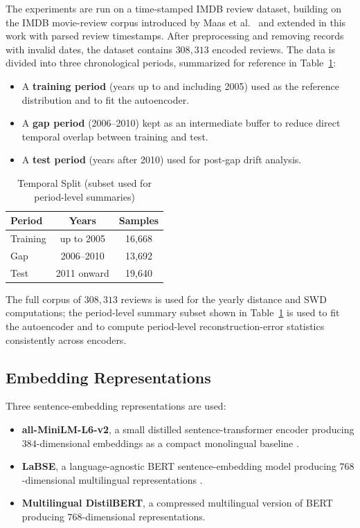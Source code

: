 \documentclass[conference]{IEEEtran}
\begin{document}
The experiments are run on a time-stamped IMDB review dataset, building on the IMDB movie-review corpus introduced by Maas et al.\ \cite{maas2011} and extended in this work with parsed review timestamps. After preprocessing and removing records with invalid dates, the dataset contains $308{,}313$ encoded reviews. The data is divided into three chronological periods, summarized for reference in Table~\ref{tab:periods}:

\begin{itemize}
    \item A \textbf{training period} (years up to and including 2005) used as the reference distribution and to fit the autoencoder.
    \item A \textbf{gap period} (2006--2010) kept as an intermediate buffer to reduce direct temporal overlap between training and test.
    \item A \textbf{test period} (years after 2010) used for post-gap drift analysis.
\end{itemize}

\begin{table}[htbp]
\caption{Temporal Split (subset used for period-level summaries)}
\label{tab:periods}
\begin{center}
\begin{tabular}{|l|c|c|}
\hline
\textbf{Period} & \textbf{Years} & \textbf{Samples} \\
\hline
Training & up to 2005 & 16{,}668 \\
Gap      & 2006--2010 & 13{,}692 \\
Test     & 2011 onward & 19{,}640 \\
\hline
\end{tabular}
\end{center}
\end{table}

The full corpus of $308{,}313$ reviews is used for the yearly distance and SWD computations; the period-level summary subset shown in Table~\ref{tab:periods} is used to fit the autoencoder and to compute period-level reconstruction-error statistics consistently across encoders.

\subsection{Embedding Representations}

Three sentence-embedding representations are used:
\begin{itemize}
    \item \textbf{all-MiniLM-L6-v2}, a small distilled sentence-transformer encoder producing $384$-dimensional embeddings as a compact monolingual baseline \cite{reimers2019}.
    \item \textbf{LaBSE}, a language-agnostic BERT sentence-embedding model producing $768$-dimensional multilingual representations \cite{feng2020}.
    \item \textbf{Multilingual DistilBERT}, a compressed multilingual version of BERT \cite{sanh2019} producing $768$-dimensional representations.
\end{itemize}
\end{document}
